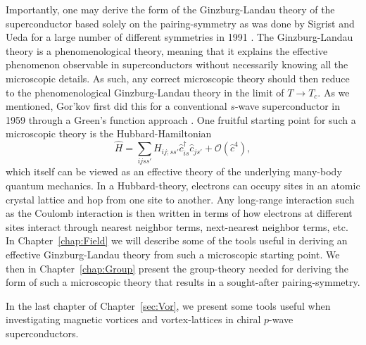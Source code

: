 Importantly, one may derive the form of the Ginzburg-Landau theory of the superconductor based solely on the pairing-symmetry as was done by Sigrist and Ueda
for a large number of different symmetries in 1991 \cite{SigristUeda91}. The Ginzburg-Landau theory is a
phenomenological theory, meaning that it explains the effective phenomenon observable in superconductors without necessarily knowing all the microscopic
details. As such, any correct microscopic theory should then reduce to the phenomenological Ginzburg-Landau theory in the limit of $T\to T_c$. As we mentioned,
Gor'kov first did this for a conventional $s$-wave superconductor in 1959 through a Green's function approach \cite{Gorkov59}. One fruitful
starting point for such a microscopic theory is the Hubbard-Hamiltonian
\begin{equation}
    \label{eq:Intro:HubbardHamiltonian}
    \hat{H} = \sum_{ijss'}H_{ij;ss'}\hat{c}_{is}^\dagger\hat{c}_{js'} + \mathcal{O}(\hat{c}^4),
\end{equation}
which itself can be viewed as an effective theory of the underlying many-body
quantum mechanics. In a Hubbard-theory, electrons can occupy sites in an atomic crystal lattice and hop from one site to another. Any long-range interaction
such as the Coulomb interaction is then written in terms
of how electrons at different sites interact through nearest neighbor terms, next-nearest neighbor terms, etc. In Chapter~\ref{chap:Field} we will describe some of the
tools useful in deriving an effective Ginzburg-Landau theory from such a microscopic starting point. We then in Chapter~\ref{chap:Group} present the
group-theory needed for deriving the form of such a microscopic theory that results in a sought-after pairing-symmetry.

In the last chapter of Chapter~\ref{sec:Vor}, we present some tools useful when investigating magnetic vortices and vortex-lattices in chiral $p$-wave
superconductors.

